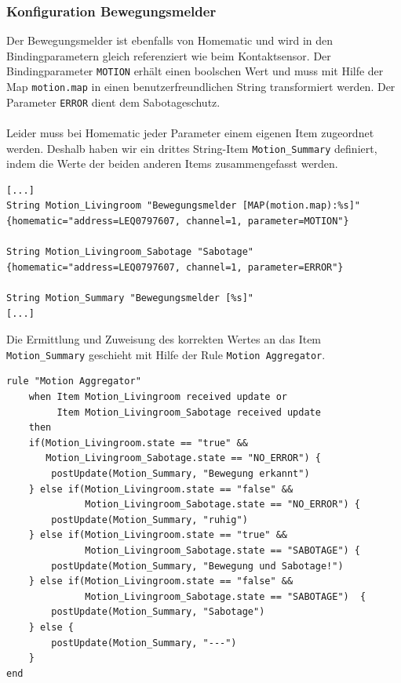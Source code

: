 \subsubsection{Konfiguration Bewegungsmelder}
Der Bewegungsmelder ist ebenfalls von Homematic und wird in den Bindingparametern gleich referenziert wie beim Kontaktsensor. Der Bindingparameter \lstinline!MOTION! erhält einen boolschen Wert und muss mit Hilfe der Map \lstinline!motion.map! in einen benutzerfreundlichen String transformiert werden. Der Parameter \lstinline!ERROR! dient dem Sabotageschutz.\\ \\
Leider muss bei Homematic jeder Parameter einem eigenen Item zugeordnet werden. Deshalb haben wir ein drittes String-Item \lstinline!Motion_Summary! definiert, indem die Werte der beiden anderen Items zusammengefasst werden. 


\begin{lstlisting}[style=csharp, caption=demo.items - Bewegungsmelder Items]
[...]
String Motion_Livingroom "Bewegungsmelder [MAP(motion.map):%s]"
{homematic="address=LEQ0797607, channel=1, parameter=MOTION"}

String Motion_Livingroom_Sabotage "Sabotage"
{homematic="address=LEQ0797607, channel=1, parameter=ERROR"}

String Motion_Summary "Bewegungsmelder [%s]"
[...]
\end{lstlisting}

Die Ermittlung und Zuweisung des korrekten Wertes an das Item \lstinline!Motion_Summary! geschieht mit Hilfe der Rule \lstinline!Motion Aggregator!.

\begin{lstlisting}[style=csharp, caption=demo.rules - Rule «Motion Aggregator»]
rule "Motion Aggregator"
	when Item Motion_Livingroom received update or
	     Item Motion_Livingroom_Sabotage received update
	then
	if(Motion_Livingroom.state == "true" &&
	   Motion_Livingroom_Sabotage.state == "NO_ERROR") {
		postUpdate(Motion_Summary, "Bewegung erkannt")
	} else if(Motion_Livingroom.state == "false" && 
	          Motion_Livingroom_Sabotage.state == "NO_ERROR") {
		postUpdate(Motion_Summary, "ruhig")	
	} else if(Motion_Livingroom.state == "true" &&
	          Motion_Livingroom_Sabotage.state == "SABOTAGE") {
		postUpdate(Motion_Summary, "Bewegung und Sabotage!")
	} else if(Motion_Livingroom.state == "false" &&
	          Motion_Livingroom_Sabotage.state == "SABOTAGE")  {
		postUpdate(Motion_Summary, "Sabotage")
	} else {
		postUpdate(Motion_Summary, "---")
	}
end
\end{lstlisting}


